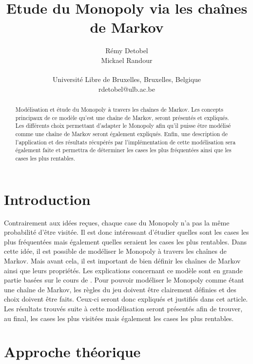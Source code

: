 \documentclass[letterpaper]{article}
\title{Etude du Monopoly via les chaînes de Markov}
\author{Rémy Detobel\\
Mickael Randour\\
\mbox{}\\
Université Libre de Bruxelles, Bruxelles, Belgique \\
rdetobel@ulb.ac.be}
\begin{document}
\maketitle



\begin{abstract}
  Modélisation et étude du Monopoly à travers les chaînes de Markov.
  Les concepts principaux de ce modèle qu'est une chaîne de Markov,
  seront présentés et expliqués.  Les différents choix permettant 
  d'adapter le Monopoly afin qu'il puisse être modélisé comme une chaîne 
  de Markov seront également expliqués.  Enfin, une description de 
  l'application et des résultats récupérés par l'implémentation de cette 
  modélisation sera également faite et permettra de déterminer les cases 
  les plus fréquentées ainsi que les cases les plus rentables.
\end{abstract}

\section{Introduction}
  Contrairement aux idées reçues, chaque case du Monopoly n'a pas la même
  probabilité d'être visitée.  Il est donc intéressant d'étudier quelles sont
  les cases les plus fréquentées mais également quelles seraient les cases
  les plus rentables.  Dans cette idée, il est possible de modéliser
  le Monopoly à travers les chaînes de Markov.  Mais avant cela, il est 
  important de bien définir les chaînes de Markov ainsi que leurs propriétés.
  Les explications concernant ce modèle sont en grande partie basées 
  sur le cours de \citet{COURS}.
  Pour pouvoir modéliser le Monopoly comme étant une chaîne de Markov, 
  les règles du jeu doivent être clairement définies et des choix doivent
  être faits.  Ceux-ci seront donc expliqués et justifiés dans cet article.
  Les résultats trouvés suite à cette modélisation seront présentés afin
  de trouver, au final, les cases les plus visitées mais également les cases
  les plus rentables.
  
  
\section{Approche théorique}
  
\end{document}
